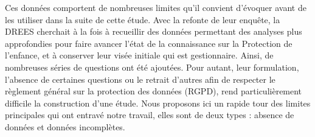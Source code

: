 \documentclass[
  12,
  a4paper,
]{report}
\begin{document}
Ces données comportent de nombreuses limites qu'il convient d'évoquer
avant de les utiliser dans la suite de cette étude. Avec la refonte de
leur enquête, la DREES cherchait à la fois à recueillir des données
permettant des analyses plus approfondies pour faire avancer l'état de
la connaissance sur la Protection de l'enfance, et à conserver leur
visée initiale qui est gestionnaire. Ainsi, de nombreuses séries de
questions ont été ajoutées. Pour autant, leur formulation, l'absence de
certaines questions ou le retrait d'autres afin de respecter le
règlement général sur la protection des données (RGPD), rend
particulièrement difficile la construction d'une étude. Nous proposons
ici un rapide tour des limites principales qui ont entravé notre
travail, elles sont de deux types : absence de données et données
incomplètes.
\end{document}
